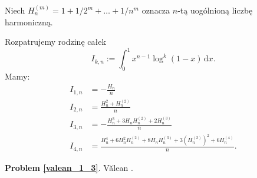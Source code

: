 %

Niech $H_{n}^{(m)} = 1 + 1/2^m + \ldots + 1/n^m$ oznacza $n$-tą uogólnioną liczbę harmoniczną.

\begin{problem_with_solution}
    \label{valean_1_3}%
    Rozpatrujemy rodzinę całek
    \begin{equation}
        I_{k,n} := \int_0^1 x^{n-1} \log^k (1-x) \,\mathrm{d} x.
    \end{equation}
    Mamy:
    \begin{align}
        I_{1,n} & = - \frac{H_n}{n} \\
        I_{2,n} & = \frac{H_n^2 + H_n^{(2)}}{n} \\
        I_{3,n} & = - \frac{H_n^3 + 3H_nH_n^{(2)} + 2H_n^{(3)}}{n} \\
        I_{4,n} & = \frac{H_n^4 + 6H_n^2 H_n^{(2)} + 8H_nH_n^{(3)} + 3(H_n^{(2)})^2 + 6H_n^{(4)}}{n}.
    \end{align}
\end{problem_with_solution}


\textbf{Problem \ref{valean_1_3}}.
Vălean \cite[s. 2, ]{nahin15}.


%